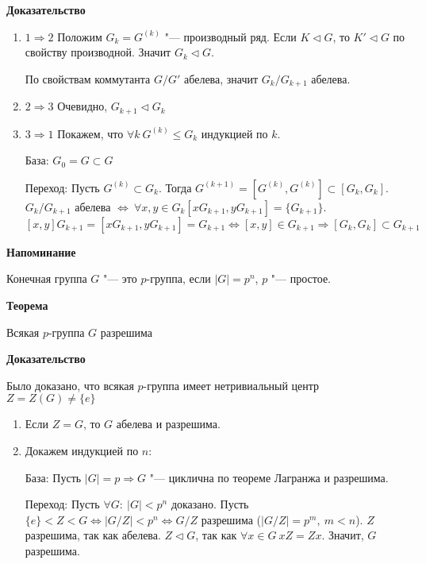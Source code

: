 \documentclass{article}
\begin{document}
\textbf{Доказательство}

\begin{enumerate}
	\item $1 \Rightarrow 2$
	Положим $G_k = G^{(k)}$ "--- производный ряд. Если $K \triangleleft G$, то $K' \triangleleft G$ по свойству производной. Значит $G_k \triangleleft G$.
	
	По свойствам коммутанта $G/G'$ абелева, значит $G_k/G_{k+1}$ абелева.
	
	\item $2 \Rightarrow 3$ Очевидно, $G_{k+1} \triangleleft G_k$
	\item $3 \Rightarrow 1$ Покажем, что $\forall k \  G^{(k)} \leq G_k$ индукцией по $k$.
	
	База: $G_0 = G \subset G$
	
	Переход: Пусть $G^{(k)} \subset G_k$. Тогда $G^{(k+1)} = [G^{(k)}, G^{(k)}] \subset [G_k, G_k]$. $G_k/G_{k+1}$ абелева $\Leftrightarrow \  \forall x, y \in G_k [xG_{k+1}, yG_{k+1}] = \{G_{k+1}\}$. $[x, y]G_{k+1} = [xG_{k+1}, yG_{k+1}] = G_{k+1} \Leftrightarrow [x, y] \in G_{k+1} \Rightarrow [G_k, G_k] \subset G_{k+1}$ 
\end{enumerate}

\vspace{10pt}

\textbf{Напоминание}

Конечная группа $G$ "--- это $p$-группа, если $|G| = p^n$, $p$ "--- простое.

\textbf{Теорема}

Всякая $p$-группа $G$ разрешима

\textbf{Доказательство}

Было доказано, что всякая $p$-группа имеет нетривиальный центр $Z = Z(G) \neq \{e\}$

\begin{enumerate}
	\item Если $Z = G$, то $G$ абелева и разрешима.
	\item Докажем индукцией по $n$:
	
	База: Пусть $|G| = p \Rightarrow G$ "--- циклична по теореме Лагранжа и разрешима.
	
	Переход: Пусть $\forall G: \  |G| < p^n$ доказано. Пусть $\{e\} < Z < G \Leftrightarrow |G/Z| < p^n \Leftrightarrow G/Z$ разрешима ($|G/Z| = p^m,\  m < n$). $Z$ разрешима, так как абелева. $Z \triangleleft G$, так как $\forall x \in G \  xZ = Zx$. Значит, $G$ разрешима.
\end{enumerate}
\end{document}
